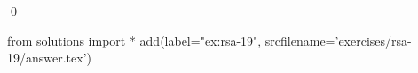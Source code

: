 
\begin{ex} 
  \label{ex:rsa-19}
  
  \qed
\end{ex} 
\begin{python0}
from solutions import *
add(label="ex:rsa-19",
    srcfilename='exercises/rsa-19/answer.tex') 
\end{python0}
